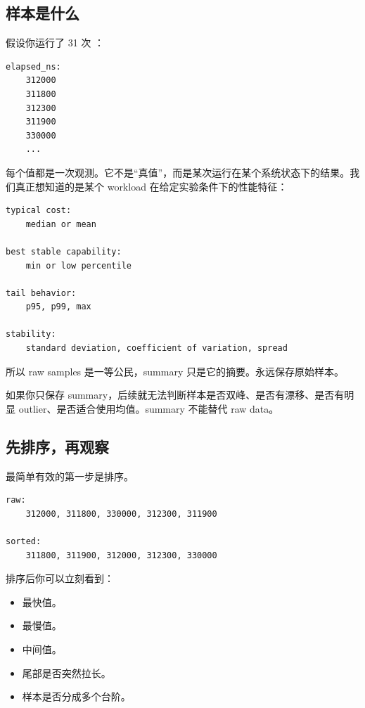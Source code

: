\subsection{样本是什么}

假设你运行了 31 次 ：

\begin{lstlisting}
elapsed_ns:
    312000
    311800
    312300
    311900
    330000
    ...
\end{lstlisting}

每个值都是一次观测。它不是“真值”，而是某次运行在某个系统状态下的结果。我们真正想知道的是某个 workload 在给定实验条件下的性能特征：

\begin{lstlisting}
typical cost:
    median or mean

best stable capability:
    min or low percentile

tail behavior:
    p95, p99, max

stability:
    standard deviation, coefficient of variation, spread
\end{lstlisting}

所以 raw samples 是一等公民，summary 只是它的摘要。永远保存原始样本。

\begin{warningbox}
如果你只保存 summary，后续就无法判断样本是否双峰、是否有漂移、是否有明显 outlier、是否适合使用均值。summary 不能替代 raw data。
\end{warningbox}

\subsection{先排序，再观察}

最简单有效的第一步是排序。

\begin{lstlisting}
raw:
    312000, 311800, 330000, 312300, 311900

sorted:
    311800, 311900, 312000, 312300, 330000
\end{lstlisting}

排序后你可以立刻看到：

\begin{itemize}
  \item 最快值。
  \item 最慢值。
  \item 中间值。
  \item 尾部是否突然拉长。
  \item 样本是否分成多个台阶。
\end{itemize}

